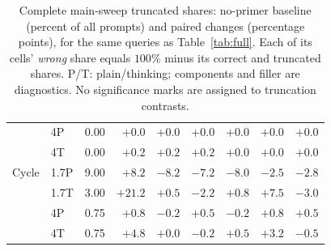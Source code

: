 \begin{table}[t]
\begin{tabular}{llrrrrrrr}
 & 4P & 0.00 & $+0.0$ & $+0.0$ & $+0.0$ & $+0.0$ & $+0.0$ & $+0.0$\\ %
 & 4T & 0.00 & $+0.2$ & $+0.2$ & $+0.2$ & $+0.0$ & $+0.0$ & $+0.0$\\ %
\addlinespace[2pt]
Cycle & 1.7P & 9.00 & $+8.2$ & $-8.2$ & $-7.2$ & $-8.0$ & $-2.5$ & $-2.8$\\ %
 & 1.7T & 3.00 & $+21.2$ & $+0.5$ & $-2.2$ & $+0.8$ & $+7.5$ & $-3.0$\\ %
 & 4P & 0.75 & $+0.8$ & $-0.2$ & $+0.5$ & $-0.2$ & $+0.8$ & $+0.5$\\ %
 & 4T & 0.75 & $+4.8$ & $+0.0$ & $-0.2$ & $+0.5$ & $+3.2$ & $-0.5$\\ %
\bottomrule
\end{tabular}
\caption{Complete main-sweep truncated shares: no-primer baseline (percent of all prompts) and paired changes (percentage points), for the same queries as Table~\ref{tab:full}. Each of its cells' \emph{wrong} share equals $100\%$ minus its correct and truncated shares. P/T: plain/thinking; components and filler are diagnostics. No significance marks are assigned to truncation contrasts.} %
\label{tab:truncmatrix}
\end{table}
